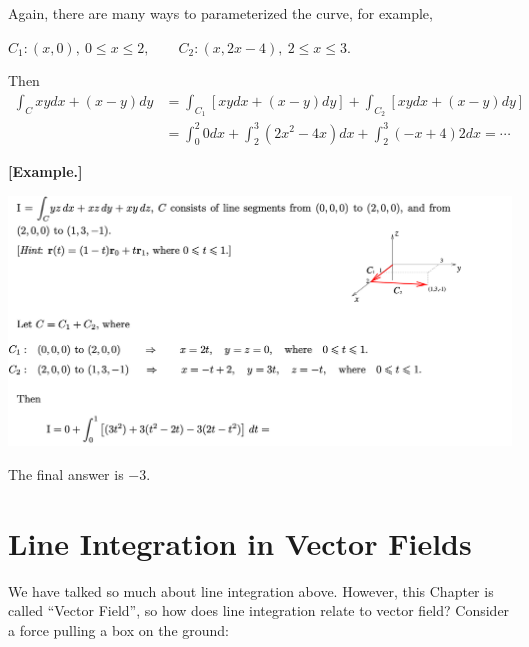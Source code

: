 \documentclass[11pt, a4paper]{MATH2023}
\newcommand{\eg}{\textbf{[Example.] }}
\begin{document}
\begin{spacing}{1.3}
    {\blue Again, there are many ways to parameterized the curve, } for example,

    $C_{1}: (x, 0),\  0 \le x \le 2, \qquad C_{2}: (x, 2x-4),\  2 \le x \le 3 .$ 
    
    Then
    \begin{align*}
        \int_{C} x y d x+(x-y) d y 
        &=\int_{C_{1}}[x y d x+(x-y) d y]+\int_{C_{2}}[x y d x+(x-y) d y] \\
        &=\int_{0}^{2} 0 d x+\int_{2}^{3}\left(2 x^{2}-4 x\right) d x+\int_{2}^{3}(-x+4) 2 d x = \cdots
    \end{align*}

    \newpage
    \eg 
    \begin{center}
        \includegraphics[scale=0.52]{images/Ch15-wrt-eg2.png}
    \end{center}
    The final answer is $-3$.

    \newpage
    \section{Line Integration in Vector Fields}
    We have talked so much about line integration above. However, this Chapter is called ``Vector Field'',
    so how does line integration relate to vector field? Consider a force pulling a box on the ground:
    \begin{center}
        \begin{tikzpicture}[x=0.75pt,y=0.75pt,yscale=-1,xscale=1]


\end{tikzpicture}
\end{center}
\end{spacing}
\end{document}
